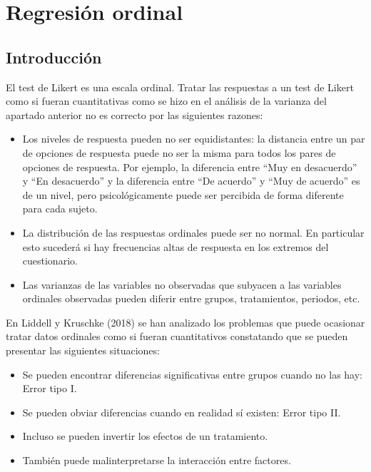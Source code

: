 \documentclass[
  letterpaper,
  DIV=11,
  numbers=noendperiod]{scrartcl}
\author{}
\date{}
\providecommand{\tightlist}{%
  \setlength{\itemsep}{0pt}\setlength{\parskip}{0pt}}\usepackage{longtable,booktabs,array}
\begin{document}
\ifdefined\Shaded\renewenvironment{Shaded}{\begin{tcolorbox}[boxrule=0pt, frame hidden, borderline west={3pt}{0pt}{shadecolor}, enhanced, breakable, sharp corners, interior hidden]}{\end{tcolorbox}}\fi

\hypertarget{regresiuxf3n-ordinal}{%
\section{Regresión ordinal}\label{regresiuxf3n-ordinal}}

\hypertarget{introducciuxf3n}{%
\subsection{Introducción}\label{introducciuxf3n}}

El test de Likert es una escala ordinal. Tratar las respuestas a un test
de Likert como si fueran cuantitativas como se hizo en el análisis de la
varianza del apartado anterior no es correcto por las siguientes
razones:

\begin{itemize}
\item
  Los niveles de respuesta pueden no ser equidistantes: la distancia
  entre un par de opciones de respuesta puede no ser la misma para todos
  los pares de opciones de respuesta. Por ejemplo, la diferencia entre
  ``Muy en desacuerdo'' y ``En desacuerdo'' y la diferencia entre ``De
  acuerdo'' y ``Muy de acuerdo'' es de un nivel, pero psicológicamente
  puede ser percibida de forma diferente para cada sujeto.
\item
  La distribución de las respuestas ordinales puede ser no normal. En
  particular esto sucederá si hay frecuencias altas de respuesta en los
  extremos del cuestionario.
\item
  Las varianzas de las variables no observadas que subyacen a las
  variables ordinales observadas pueden diferir entre grupos,
  tratamientos, periodos, etc.
\end{itemize}

En Liddell y Kruschke (2018) se han analizado los problemas que puede
ocasionar tratar datos ordinales como si fueran cuantitativos
constatando que se pueden presentar las siguientes situaciones:

\begin{itemize}
\tightlist
\item
  Se pueden encontrar diferencias significativas entre grupos cuando no
  las hay: Error tipo I.
\item
  Se pueden obviar diferencias cuando en realidad sí existen: Error tipo
  II.
\item
  Incluso se pueden invertir los efectos de un tratamiento.
\item
  También puede malinterpretarse la interacción entre factores.
\end{itemize}
\end{document}
